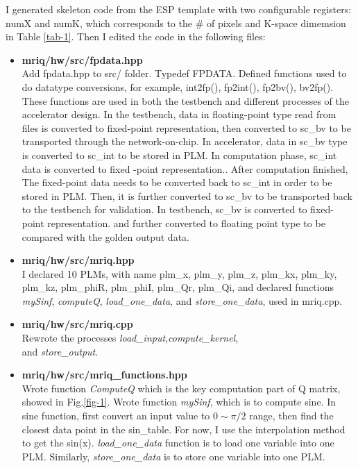 I generated skeleton code from the ESP template with two configurable registers: 
numX and numK, which corresponds to the \# of pixels and K-space dimemsion in 
Table \ref{tab-1}. Then I edited the code in the following files:\\
\begin{itemize}
\item \textbf{mriq/hw/src/fpdata.hpp} \\
Add fpdata.hpp to src/ folder. Typedef FPDATA. Defined functions used to do datatype
 conversions, for example, int2fp(), fp2int(), fp2bv(), bv2fp(). These functions are
 used in both the testbench and different processes of the accelerator design. In the
 testbench, data in floating-point type read from files is converted to fixed-point 
representation, then converted to sc\_bv to be transported through the network-on-chip. 
In accelerator, data in sc\_bv  type is converted to sc\_int to be stored in PLM. In 
computation phase, sc\_int data is converted to fixed -point representation.. After 
computation finished, The fixed-point data needs to be converted back to sc\_int in 
order to be stored in PLM. Then, it is further converted to sc\_bv to be transported 
back to the testbench for validation. In testbench, sc\_bv is converted to fixed-point 
representation. and further converted to floating point type to be compared with the 
golden output data.

\item \textbf{mriq/hw/src/mriq.hpp} \\
I declared 10 PLMs, with name plm\_x, plm\_y, plm\_z, plm\_kx, plm\_ky, plm\_kz, 
plm\_phiR, plm\_phiI, plm\_Qr,  plm\_Qi, and declared functions \textit{mySinf}, 
\textit{computeQ}, \textit{load\_one\_data}, and \textit{store\_one\_data}, used
 in mriq.cpp.

\item \textbf{mriq/hw/src/mriq.cpp} \\
Rewrote the processes \textit{load\_input},\textit{compute\_kernel}, \\
and  \textit{store\_output}. 
\item \textbf{mriq/hw/src/mriq\_functions.hpp} \\
Wrote function \textit{ComputeQ} which is the key computation part of Q matrix, 
showed in Fig.\ref{fig-1}. Wrote function \textit{mySinf}, which is to compute 
sine. In sine function, first convert an input value to $0\sim \pi/2$ range, 
then find the closest data point in the sin\_table. For now, I use the interpolation 
method to get the sin(x). \textit{load\_one\_data} function is to load one variable
 into one PLM. Similarly, \textit{store\_one\_data} is to store one variable into 
one PLM.


\end{itemize}
